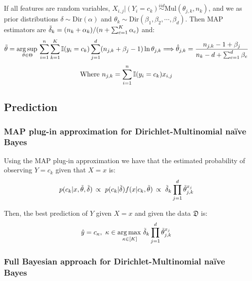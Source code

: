 If all features are  random variables, $X_{i,j}|(Y_i=c_k)\overset{iid}{\sim}\text{Mul}(\theta_{j,k},n_k)$, and we as prior distributions $\delta\sim\text{Dir}(\alpha)$ and $\theta_k\sim\text{Dir}(\beta_1,\beta_2,\cdots,\beta_d)$. Then MAP estimators are $\Tilde{\delta}_k = (n_k+\alpha_k)/(n+\sum_{c=1}^K\alpha_c)$ and:
\begin{equation*}
    \Tilde{\theta} = \operatorname*{arg\,sup\,}_{\theta\in\Theta}  \sum_{i=1}^n\sum_{k=1}^K\operatorname{\mathbb{I}}(y_i=c_k)\sum_{j=1}^d(n_{j,k}+\beta_j-1)\ln \theta_{j,k} \Longrightarrow \hat{\theta}_{j,k} = \frac{n_{j,k}-1+\beta_j}{n_k-d+\sum_{e=1}^d\beta_e}
\end{equation*}
\begin{equation*}
    \text{Where } n_{j,k}=\sum_{i=1}^n\operatorname{\mathbb{I}}(y_i=c_k)x_{i,j}
\end{equation*}

\subsection{Prediction}

\subsubsection*{MAP plug-in approximation for Dirichlet-Multinomial naïve Bayes}
Using the MAP plug-in approximation we have that the estimated probability of observing $Y=c_k$ given that $X=x$ is:
\begin{equation*}
    p(c_k|x, \Tilde{\theta},\Tilde{\delta})\, \propto\ p(c_k|\Tilde{\delta})f(x|c_k,\Tilde{\theta})\, \propto\  \Tilde{\delta}_k\prod_{j=1}^d \Tilde{\theta}_{j,k}^{x_j} 
\end{equation*}

Then, the best prediction of $Y$ given $X=x$ and given the data $\mathfrak{D}$ is:
\begin{equation*}
    \hat{y} = c_{\kappa},\ \kappa \in \operatorname*{arg\,max\,}_{\kappa\in [K]} \Tilde{\delta}_k\prod_{j=1}^d \Tilde{\theta}_{j,k}^{x_j} 
\end{equation*}

\subsubsection*{Full Bayesian approach for Dirichlet-Multinomial naïve Bayes}

